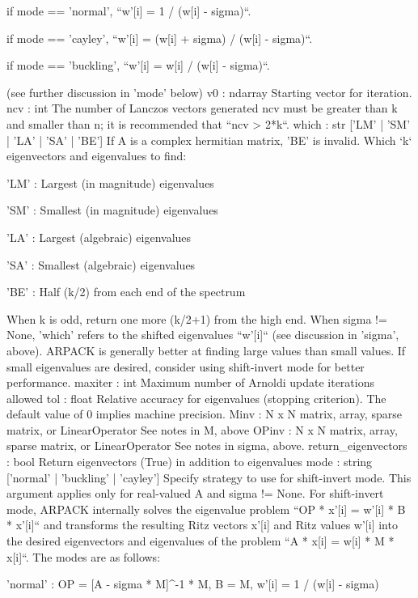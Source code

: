 \begin{DoxyVerb}
        if mode == 'normal', ``w'[i] = 1 / (w[i] - sigma)``.

        if mode == 'cayley', ``w'[i] = (w[i] + sigma) / (w[i] - sigma)``.

        if mode == 'buckling', ``w'[i] = w[i] / (w[i] - sigma)``.

    (see further discussion in 'mode' below)
v0 : ndarray
    Starting vector for iteration.
ncv : int
    The number of Lanczos vectors generated ncv must be greater than k and
    smaller than n; it is recommended that ``ncv > 2*k``.
which : str ['LM' | 'SM' | 'LA' | 'SA' | 'BE']
    If A is a complex hermitian matrix, 'BE' is invalid.
    Which `k` eigenvectors and eigenvalues to find:

        'LM' : Largest (in magnitude) eigenvalues

        'SM' : Smallest (in magnitude) eigenvalues

        'LA' : Largest (algebraic) eigenvalues

        'SA' : Smallest (algebraic) eigenvalues

        'BE' : Half (k/2) from each end of the spectrum

    When k is odd, return one more (k/2+1) from the high end.
    When sigma != None, 'which' refers to the shifted eigenvalues ``w'[i]``
    (see discussion in 'sigma', above).  ARPACK is generally better
    at finding large values than small values.  If small eigenvalues are
    desired, consider using shift-invert mode for better performance.
maxiter : int
    Maximum number of Arnoldi update iterations allowed
tol : float
    Relative accuracy for eigenvalues (stopping criterion).
    The default value of 0 implies machine precision.
Minv : N x N matrix, array, sparse matrix, or LinearOperator
    See notes in M, above
OPinv : N x N matrix, array, sparse matrix, or LinearOperator
    See notes in sigma, above.
return_eigenvectors : bool
    Return eigenvectors (True) in addition to eigenvalues
mode : string ['normal' | 'buckling' | 'cayley']
    Specify strategy to use for shift-invert mode.  This argument applies
    only for real-valued A and sigma != None.  For shift-invert mode,
    ARPACK internally solves the eigenvalue problem
    ``OP * x'[i] = w'[i] * B * x'[i]``
    and transforms the resulting Ritz vectors x'[i] and Ritz values w'[i]
    into the desired eigenvectors and eigenvalues of the problem
    ``A * x[i] = w[i] * M * x[i]``.
    The modes are as follows:

        'normal' :
            OP = [A - sigma * M]^-1 * M,
            B = M,
            w'[i] = 1 / (w[i] - sigma)


\end{DoxyVerb}
